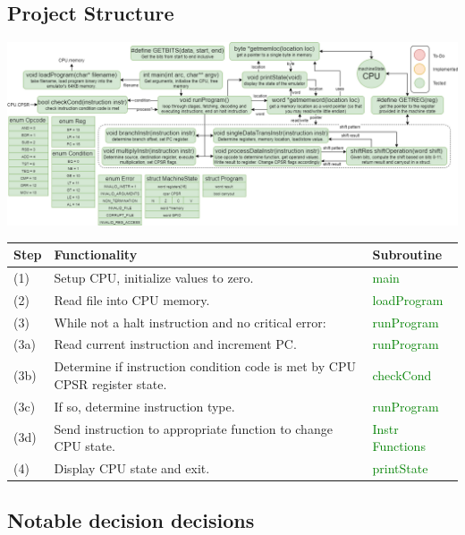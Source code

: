 \documentclass[11pt]{article}
\begin{document}
    \subsection*{Project Structure}
        \begin{center}
            \includegraphics[width = \textwidth]{project status}
        \end{center}
    \begin{center}
        \begin{tabular}{l l l}
            Step & Functionality & Subroutine \\
            \hline
            (1) & Setup CPU, initialize values to zero. & \textcolor{green}{main} \\
            (2) & Read file into CPU memory. & \textcolor{green}{loadProgram}\\
            (3) & While not a halt instruction and no critical error: & \textcolor{green}{runProgram} \\
            (3a) & Read current instruction and increment PC.  & \textcolor{green}{runProgram}\\
            (3b) & Determine if instruction condition code is met by CPU CPSR register state. & \textcolor{green}{checkCond}\\
            (3c) & If so, determine instruction type.  & \textcolor{green}{runProgram}\\
            (3d) & Send instruction to appropriate function to change CPU state. & \textcolor{green}{Instr Functions}\\
            (4) & Display CPU state and exit. & \textcolor{green}{printState} \\
        \end{tabular}
    \end{center}

    \subsection*{Notable decision decisions}
\end{document}
